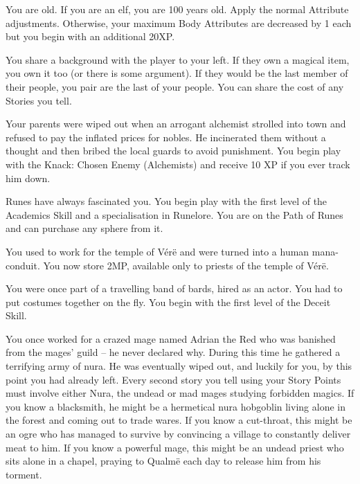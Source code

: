 \begin{list}{\addtocounter{list}{1}\textbf{:}}{\raggedleft}
\item{You are old.  If you are an elf, you are 100 years old.  Apply the normal Attribute adjustments.  Otherwise, your maximum Body Attributes are decreased by 1 each but you begin with an additional 20XP.}

\item{You share a background with the player to your left.  If they own a magical item, you own it too (or there is some argument).  If they would be the last member of their people, you pair are the last of your people.  You can share the cost of any Stories you tell.}

\item{Your parents were wiped out when an arrogant alchemist strolled into town and refused to pay the inflated prices for nobles.  He incinerated them without a thought and then bribed the local guards to avoid punishment.  You begin play with the Knack: Chosen Enemy (Alchemists) and receive 10 XP if you ever track him down.}

\item{Runes have always fascinated you.  You begin play with the first level of the Academics Skill and a specialisation in Runelore.  You are on the Path of Runes and can purchase any sphere from it.}

\item{You used to work for the temple of V\'{e}r\"{e} and were turned into a human mana-conduit.  You now store 2MP, available only to priests of the temple of V\'{e}r\"{e}.}

\item{You were once part of a travelling band of bards, hired as an actor.  You had to put costumes together on the fly.  You begin with the first level of the Deceit Skill.}

\item{You once worked for a crazed mage named Adrian the Red who was banished from the mages' guild -- he never declared why.  During this time he gathered a terrifying army of nura.  He was eventually wiped out, and luckily for you, by this point you had already left.  Every second story you tell using your Story Points must involve either Nura, the undead or mad mages studying forbidden magics.  If you know a blacksmith, he might be a hermetical nura hobgoblin living alone in the forest and coming out to trade wares.  If you know a cut-throat, this might be an ogre who has managed to survive by convincing a village to constantly deliver meat to him.  If you know a powerful mage, this might be an undead priest who sits alone in a chapel, praying to Qualm\"{e} each day to release him from his torment.}


\end{list}
